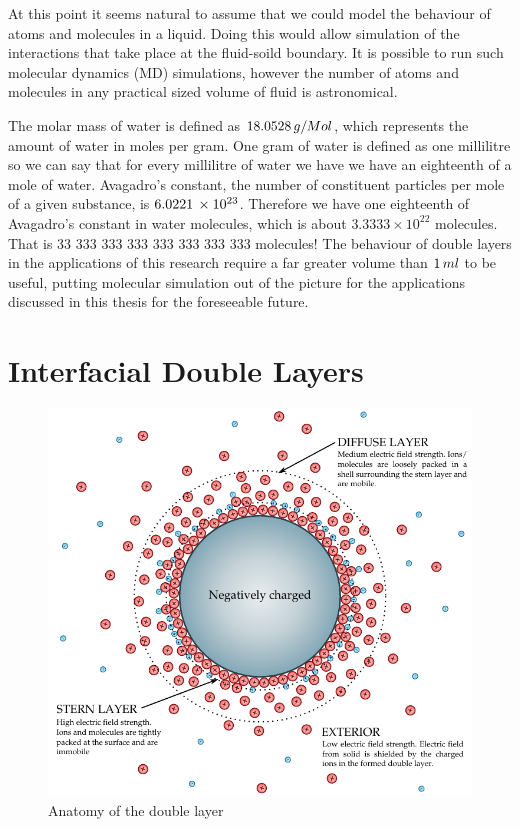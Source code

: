At this point it seems natural to assume that we could model the behaviour of atoms and molecules in a liquid. Doing this would allow simulation of the interactions that take place at the fluid-soild boundary. It is possible to run such molecular dynamics (MD) simulations, however the number of atoms and molecules in any practical sized volume of fluid is astronomical.

The molar mass of water is defined as $18.0528\thinspace g/Mol$, which represents the amount of water in moles per gram. One gram of water is defined as one millilitre so we can say that for every millilitre of water we have we have an eighteenth of a mole of water. Avagadro's constant, the number of constituent particles per mole of a given substance, is $6.0221\thinspace \times 10^{23}$. Therefore we have one eighteenth of Avagadro's constant in water molecules, which is about $3.3333\times 10^{22}$ molecules. That is 33 333 333 333 333 333 333 333 molecules! The behaviour of double layers in the applications of this research require a far greater volume than $1\thinspace ml$ to be useful, putting molecular simulation out of the picture for the applications discussed in this thesis for the foreseeable future.

\section{Interfacial Double Layers}

\begin{figure}
    \begin{center}
        \includegraphics{content/introduction/graphics/doubleLayer_labelled.pdf}
    \end{center}
    \caption{Anatomy of the double layer}
    \label{fig:doubleLayer_anatomy}
\end{figure}

